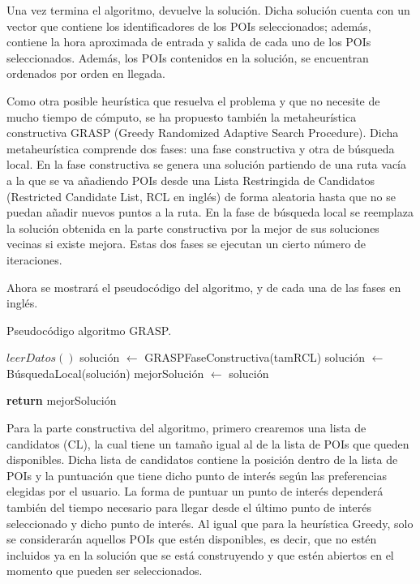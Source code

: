 Una vez termina el algoritmo, devuelve la solución. Dicha solución cuenta con un vector que contiene los identificadores de los POIs seleccionados; además, contiene la hora aproximada de entrada y salida de cada uno de los POIs seleccionados. Además, los POIs contenidos en la solución, se encuentran ordenados por orden en llegada.\newline

Como otra posible heurística que resuelva el problema y que no necesite de mucho tiempo de cómputo, se ha propuesto también la metaheurística constructiva GRASP (Greedy Randomized Adaptive Search Procedure). Dicha metaheurística comprende dos fases: una fase constructiva y otra de búsqueda local. En la fase constructiva se genera una solución partiendo de una ruta vacía a la que se va añadiendo POIs desde una Lista Restringida de Candidatos (Restricted Candidate List, RCL en inglés) de forma aleatoria hasta que no se puedan añadir nuevos puntos a la ruta. En la fase de búsqueda local se reemplaza la solución obtenida en la parte constructiva por la mejor de sus soluciones vecinas si existe mejora. Estas dos fases se ejecutan un cierto número de iteraciones.\newline

Ahora se mostrará el pseudocódigo del algoritmo, y de cada una de las fases en inglés.
\vspace{0.06in}

\begin{algorithm}
	\caption{Pseudocódigo algoritmo GRASP.}
	\label{alg:grasp}
\begin{algorithmic}
	\State $ leerDatos() $
		\State solución $ \gets $ GRASPFaseConstructiva(tamRCL)
		\State  solución $\gets$ BúsquedaLocal(solución)
			\State  mejorSolución $\gets$ solución
		\EndIf
	\EndFor
	
	\State \textbf{return} mejorSolución
	\EndFunction
\end{algorithmic}
\end{algorithm}

\vspace{0.06in}
Para la parte constructiva del algoritmo, primero crearemos una lista de candidatos (CL), la cual tiene un tamaño igual al de la lista de POIs que queden disponibles. Dicha lista de candidatos contiene la posición dentro de la lista de POIs y la puntuación que tiene dicho punto de interés según las preferencias elegidas por el usuario. La forma de puntuar un punto de interés dependerá también del tiempo necesario para llegar desde el último punto de interés seleccionado y dicho punto de interés. Al igual que para la heurística Greedy, solo se considerarán aquellos POIs que estén disponibles, es decir, que no estén incluidos ya en la solución que se está construyendo y que estén abiertos en el momento que pueden ser seleccionados.\newline

